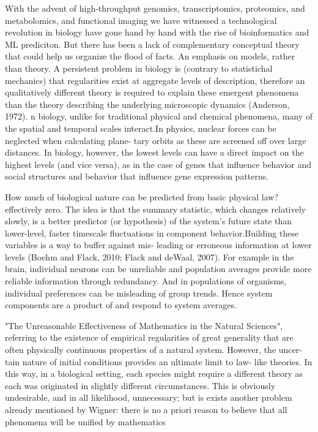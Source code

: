 \documentclass[onecollarge,runningheads]{svjour2}
\begin{document}
With the advent of high-throughput genomics, transcriptomics, proteomics, and metabolomics, and functional imaging we have witnessed a technological revolution in biology have gone hand by hand with the rise of bioinformatics and ML prediciton.
But there has been a lack of complementary conceptual theory that could help us organize the flood of facts. An emphasis on models, rather than theory.
A persistent problem in biology is (contrary to statistichal mechanics) that regularities exist at aggregate levels of description, therefore an qualitatively different theory is required to explain these emergent phenomena than the theory describing the underlying microscopic dynamics (Anderson, 1972).
 n biology, unlike for traditional physical and chemical phenomena, many of the spatial and temporal scales interact.In physics, nuclear forces can be neglected when calculating plane- tary orbits as these are screened off over large distances. In biology, however, the lowest levels can have a direct impact on the highest levels (and vice versa), as in the case of genes that influence behavior and social structures and behavior that influence gene expression patterns.
 
How much of biological nature can be predicted from basic physical law? effectively zero.
The idea is that the summary statistic, which changes relatively slowly, is a better predictor (or hypothesis) of the system's future state than lower-level, faster timescale fluctuations in component behavior.Building these variables is a way to buffer against mis- leading or erroneous information at lower levels (Boehm and Flack, 2010; Flack and deWaal, 2007). For example in the brain, individual neurons can be unreliable and population averages provide more reliable information through redundancy. And in populations of organisms, individual preferences can be misleading of group trends. Hence system components are a product of and respond to system averages.

"The Unreasonable Effectiveness of Mathematics in the Natural Sciences", referring to the existence of empirical regularities of great generality that are often physically continuous properties of a natural system. However, the uncer- tain nature of initial conditions provides an ultimate limit to law- like theories. In this way, in a biological setting, each species might require a different theory as each was originated in slightly different circumstances. This is obviously undesirable, and in all likelihood, unnecessary; but is exists another problem already mentioned by  Wigner: there is no a priori reason to believe that all phenomena will be unified by mathematics
\end{document}
